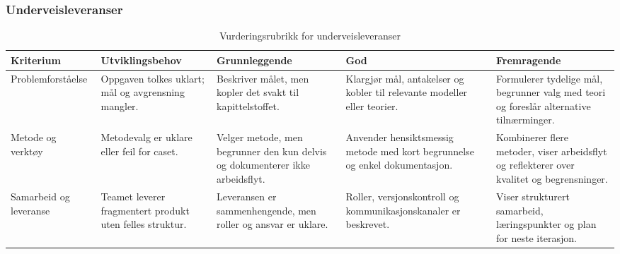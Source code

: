 \subsubsection{Underveisleveranser}
\begin{table}[h]
    \centering
    \caption{Vurderingsrubrikk for underveisleveranser}
    \label{tab:rubrikk-underveis}
    \begin{tabular}{p{2.8cm}p{3.0cm}p{3.0cm}p{3.0cm}p{3.0cm}}
        \toprule
        \textbf{Kriterium} & \textbf{Utviklingsbehov} & \textbf{Grunnleggende} & \textbf{God} & \textbf{Fremragende} \\
        \midrule
        Problemforståelse & Oppgaven tolkes uklart; mål og avgrensning mangler. & Beskriver målet, men kopler det svakt til kapittelstoffet. & Klargjør mål, antakelser og kobler til relevante modeller eller teorier. & Formulerer tydelige mål, begrunner valg med teori og foreslår alternative tilnærminger. \\
        Metode og verktøy & Metodevalg er uklare eller feil for caset. & Velger metode, men begrunner den kun delvis og dokumenterer ikke arbeidsflyt. & Anvender hensiktsmessig metode med kort begrunnelse og enkel dokumentasjon. & Kombinerer flere metoder, viser arbeidsflyt og reflekterer over kvalitet og begrensninger. \\
        Samarbeid og leveranse & Teamet leverer fragmentert produkt uten felles struktur. & Leveransen er sammenhengende, men roller og ansvar er uklare. & Roller, versjonskontroll og kommunikasjonskanaler er beskrevet. & Viser strukturert samarbeid, læringspunkter og plan for neste iterasjon. \\
        \bottomrule
    \end{tabular}
\end{table}

